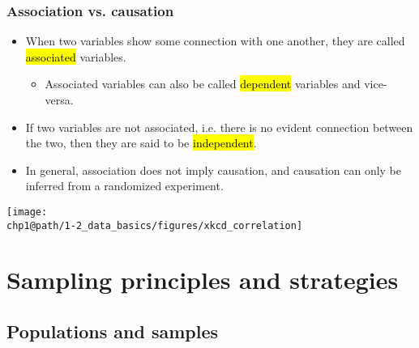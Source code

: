\documentclass[slidestop,compress,mathserif]{beamer}
\makeatletter
\def\chp1@path{../../Chp 1}
\makeatother
\begin{document}

\begin{frame}
\frametitle{Association vs. causation}

\begin{itemize}

\item When two variables show some connection with one another, they are called \hl{associated} variables.
\begin{itemize}
\item Associated variables can also be called \hl{dependent} variables and vice-versa.
\end{itemize}

\item If two variables are not associated, i.e. there is no evident connection between the two, then they are said to be \hl{independent}.

\item In general, association does not imply causation, and causation can only be inferred from a randomized experiment.

\end{itemize}

\begin{center}
\texttt{[image: \\chp1@path/1-2\_data\_basics/figures/xkcd\_correlation]} \\
{\tiny {}}
\end{center}

\end{frame}



\section{Sampling principles and strategies}


\subsection{Populations and samples}

\end{document}
